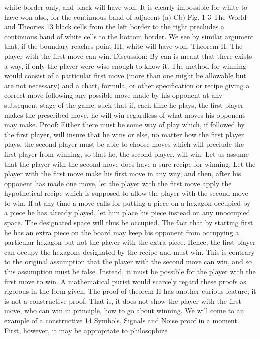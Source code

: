 white border only, and black will have won. It is clearly impossible
for white to have won also, for the continuous band of adjacent
(a) Cb)
Fig. 1-3
The World and Theories 13
black cells from the left border to the right precludes a continuous
band of white cells to the bottom border. We see by similar argument
that, if the boundary reaches point III, white will have won.
Theorem II: The player with the first move can win.
Discussion: By can is meant that there exists a way, if only the
player were wise enough to know it. The method for winning would
consist of a particular first move (more than one might be allowable
but are not necessary) and a chart, formula, or other specification
or recipe giving a correct move following any possible move
made by his opponent at any subsequent stage of the game, such
that if, each time he plays, the first player makes the prescribed
move, he will win regardless of what moves his opponent may
make.
Proof: Either there must be some way of play which, if followed
by the first player, will insure that he wins or else, no matter how
the first player plays, the second player must be able to choose
moves which will preclude the first player from winning, so that he,
the second player, will win. Let us assume that the player with the
second move does have a sure recipe for winning. Let the player
with the first move make his first move in any way, and then, after
his opponent has made one move, let the player with the first
move apply the hypothetical recipe which is supposed to allow the
player with the second move to win. If at any time a move calls for
putting a piece on a hexagon occupied by a piece he has already
played, let him place his piece instead on any unoccupied space.
The designated space will thus be occupied. The fact that by
starting first he has an extra piece on the board may keep his
opponent from occupying a particular hexagon but not the player
with the extra piece. Hence, the first player can occupy the hexagons
designated by the recipe and must win. This is contrary to
the original assumption that the player with the second move can
win, and so this assumption must be false. Instead, it must be
possible for the player with the first move to win.
A mathematical purist would scarcely regard these proofs as
rigorous in the form given. The proof of theorem II has another
curious feature; it is not a constructive proof. That is, it does not
show the player with the first move, who can win in principle, how
to go about winning. We will come to an example of a constructive
14
Symbols, Signals and Noise
proof in a moment. First, however, it may be appropriate to philosophize
